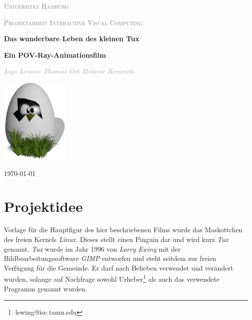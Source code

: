 \documentclass[11pt,parskip]{scrartcl}
\begin{document}
%
\begin{titlepage}
  \begin{sffamily}
    {\scshape\LARGE \textcolor{gray}{Universität Hamburg}\par}
    {\scshape\Large \textcolor{gray}{Projektarbeit Interactive Visual
        Computing}\par}
    \vspace{2.5cm}
    \centering
    {\huge\bfseries Das wunderbare Leben des kleinen Tux\par}
    {\large\bfseries Ein POV-Ray-Animationsfilm\par}
    \vspace{1.5cm}
    {\Large\itshape \textcolor{darkgray}{
        Inga Lemme \quad{}
        Thomas Ort \quad{}
        Melanie Remmels
      }\par
    }
    \vfill
    \includegraphics[width=0.25\textwidth]{./fig/tuxegg.png}\par\vspace{1cm}
    \vfill
    {\large \today\par}
  \end{sffamily}
\end{titlepage}
%


\newpage
\tableofcontents
\newpage


\section{Projektidee}
Vorlage für die Hauptfigur des hier beschriebenen Films wurde das Maskottchen des
freien Kernels \emph{Linux}. Dieses stellt einen Pinguin dar und wird kurz
\emph{Tux} genannt. \emph{Tux} wurde im Jahr 1996 von \emph{Larry Ewing} mit
der Bildbearbeitungssoftware \emph{GIMP} entworfen und steht seitdem zur freien
Verfügung für die Gemeinde. Er darf nach Belieben verwendet und verändert
wurden, solange auf Nachfrage sowohl Urheber\footnote{lewing@isc.tamu.edu} als
auch das verwendete Programm genannt wurden. \cite{ewing}
\end{document}
